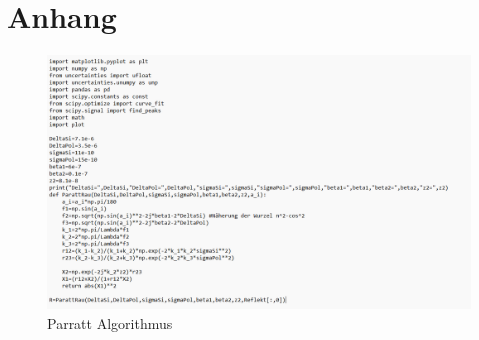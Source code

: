 \section*{Anhang}
\begin{figure}
    \centering
    \includegraphics[scale=0.9]{Bilder/python.png}
    \caption{Parratt Algorithmus}
\end{figure}    


    